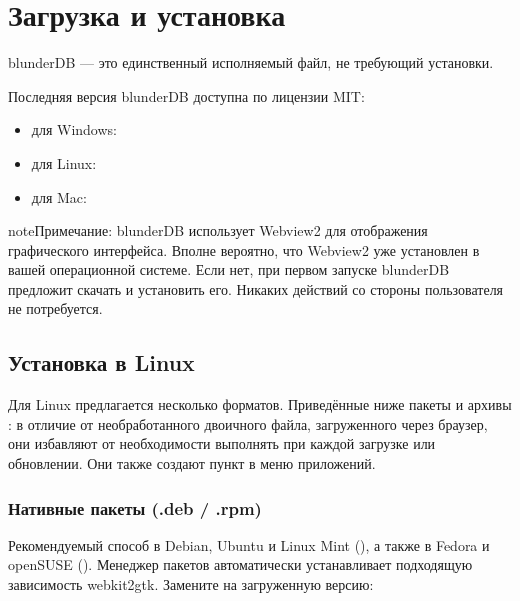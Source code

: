 \documentclass[letterpaper,10pt,russian]{sphinxmanual}
\begin{document}
\section{Загрузка и установка}
\label{\detokenize{telecharge_install:telechargement-et-installation}}\label{\detokenize{telecharge_install:telecharge-install}}\label{\detokenize{telecharge_install::doc}}
\sphinxAtStartPar
blunderDB — это единственный исполняемый файл, не требующий установки.

\sphinxAtStartPar
Последняя версия blunderDB доступна по лицензии MIT:
\begin{itemize}
\item {} 
\sphinxAtStartPar
для Windows: 

\item {} 
\sphinxAtStartPar
для Linux: 

\item {} 
\sphinxAtStartPar
для Mac: 

\end{itemize}

\begin{sphinxadmonition}{note}{Примечание:}
\sphinxAtStartPar
blunderDB использует Webview2 для отображения графического интерфейса. Вполне вероятно, что Webview2 уже установлен в вашей операционной системе. Если нет, при первом запуске blunderDB предложит скачать и установить его. Никаких действий со стороны пользователя не потребуется.
\end{sphinxadmonition}


\subsection{Установка в Linux}
\label{\detokenize{telecharge_install:installation-sous-linux}}
\sphinxAtStartPar
Для Linux предлагается несколько форматов. Приведённые ниже пакеты и архивы : в отличие от необработанного двоичного файла, загруженного через браузер, они избавляют от необходимости выполнять  при каждой загрузке или обновлении. Они также создают пункт в меню приложений.


\subsubsection{Нативные пакеты (.deb / .rpm)}
\label{\detokenize{telecharge_install:paquets-natifs-deb-rpm}}
\sphinxAtStartPar
Рекомендуемый способ в Debian, Ubuntu и Linux Mint (), а также в Fedora и openSUSE (). Менеджер пакетов автоматически устанавливает подходящую зависимость webkit2gtk. Замените  на загруженную версию:
\end{document}

